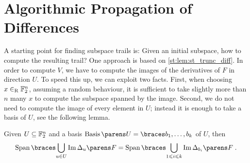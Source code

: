 \section{Algorithmic Propagation of Differences}\label{sec:st:compute_trail}

A starting point for finding subspace trails is: Given an initial subspace, how to compute the resulting trail?
One approach is based on \cref{st:lem:st_trunc_diff}.
In order to compute $V$, we have to compute the images of the derivatives of $F$ in direction $U$.
To speed this up, we can exploit two facts.
First, when choosing $x \in_\mathrm{R} \mathbb{F}_2^n$, assuming a random behaviour, it is sufficient to take slightly more than $n$ many $x$ to compute the subspace spanned by the image.
Second, we do not need to compute the image of every element in $U$; instead it is enough to take a basis of $U$, see the following lemma.
\begin{lemma}\label{st:lem:2}
Given $U \subseteq \mathbb{F}_2^n$ and a basis $\Basis{U} = \set{b_1, \ldots, b_k}$ of $U$, then
\begin{equation*}
    \Span{\bigcup_{u \in U} \Im{\derive{u}{F}}} = \Span{\bigcup_{1 \leqslant i \leqslant k} \Im{\derive{b_i}{F}}}\;.
\end{equation*}
\end{lemma}
